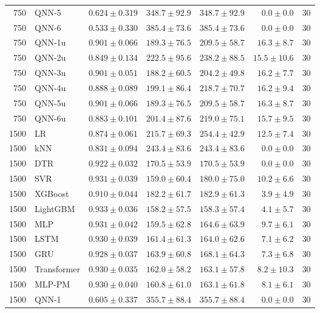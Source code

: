\begin{longtable}{rlrrrrr}
750 & QNN-5 & $0.624 \pm 0.319$ & $348.7 \pm 92.9$ & $348.7 \pm 92.9$ & $0.0 \pm 0.0$ & 30 \\
750 & QNN-6 & $0.533 \pm 0.330$ & $385.4 \pm 73.6$ & $385.4 \pm 73.6$ & $0.0 \pm 0.0$ & 30 \\
750 & QNN-1u & $0.901 \pm 0.066$ & $189.3 \pm 76.5$ & $209.5 \pm 58.7$ & $16.3 \pm 8.7$ & 30 \\
750 & QNN-2u & $0.849 \pm 0.134$ & $222.5 \pm 95.6$ & $238.2 \pm 88.5$ & $15.5 \pm 10.6$ & 30 \\
750 & QNN-3u & $0.901 \pm 0.051$ & $188.2 \pm 60.5$ & $204.2 \pm 49.8$ & $16.2 \pm 7.7$ & 30 \\
750 & QNN-4u & $0.888 \pm 0.089$ & $199.1 \pm 86.4$ & $218.7 \pm 70.7$ & $16.2 \pm 9.4$ & 30 \\
750 & QNN-5u & $0.901 \pm 0.066$ & $189.3 \pm 76.5$ & $209.5 \pm 58.7$ & $16.3 \pm 8.7$ & 30 \\
750 & QNN-6u & $0.883 \pm 0.101$ & $201.4 \pm 87.6$ & $219.0 \pm 75.1$ & $15.7 \pm 9.5$ & 30 \\
\midrule
1500 & LR & $0.874 \pm 0.061$ & $215.7 \pm 69.3$ & $254.4 \pm 42.9$ & $12.5 \pm 7.4$ & 30 \\
1500 & kNN & $0.831 \pm 0.094$ & $243.4 \pm 83.6$ & $243.4 \pm 83.6$ & $0.0 \pm 0.0$ & 30 \\
1500 & DTR & $0.922 \pm 0.032$ & $170.5 \pm 53.9$ & $170.5 \pm 53.9$ & $0.0 \pm 0.0$ & 30 \\
1500 & SVR & $0.931 \pm 0.039$ & $159.0 \pm 60.4$ & $180.0 \pm 75.0$ & $10.2 \pm 6.6$ & 30 \\
1500 & XGBoost & $0.910 \pm 0.044$ & $182.2 \pm 61.7$ & $182.9 \pm 61.3$ & $3.9 \pm 4.9$ & 30 \\
1500 & LightGBM & $0.933 \pm 0.036$ & $158.2 \pm 57.5$ & $158.3 \pm 57.4$ & $4.1 \pm 5.7$ & 30 \\
1500 & MLP & $0.931 \pm 0.042$ & $159.5 \pm 62.8$ & $164.6 \pm 63.9$ & $9.7 \pm 6.1$ & 30 \\
1500 & LSTM & $0.930 \pm 0.039$ & $161.4 \pm 61.3$ & $164.0 \pm 62.6$ & $7.1 \pm 6.2$ & 30 \\
1500 & GRU & $0.928 \pm 0.037$ & $163.9 \pm 60.8$ & $168.1 \pm 64.3$ & $7.3 \pm 6.8$ & 30 \\
1500 & Transformer & $0.930 \pm 0.035$ & $162.0 \pm 58.2$ & $163.1 \pm 57.8$ & $8.2 \pm 10.3$ & 30 \\
1500 & MLP-PM & $0.930 \pm 0.040$ & $160.8 \pm 61.0$ & $163.1 \pm 61.8$ & $8.1 \pm 6.1$ & 30 \\
1500 & QNN-1 & $0.605 \pm 0.337$ & $355.7 \pm 88.4$ & $355.7 \pm 88.4$ & $0.0 \pm 0.0$ & 30 \\

\end{longtable}
